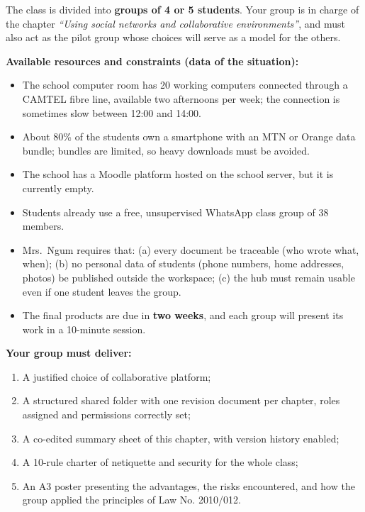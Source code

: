 \documentclass[11pt]{article}
\newcounter{popsec}
\newcounter{popsub}
\newcommand{\courssub}[1]{%
  \stepcounter{popsub}%
  \par\vspace{9pt}\noindent{\popxbold\fontsize{11.5}{13}\selectfont\color{popink}{\color{poporange}\thepopsec.\thepopsub}\hspace{6pt}#1}\par\nopagebreak\vspace{4pt}
}
\begin{document}
The class is divided into \textbf{groups of 4 or 5 students}. Your group is in charge of the chapter \emph{``Using social networks and collaborative environments''}, and must also act as the pilot group whose choices will serve as a model for the others.

\textbf{Available resources and constraints (data of the situation):}
\begin{itemize}
\item The school computer room has 20 working computers connected through a CAMTEL fibre line, available two afternoons per week; the connection is sometimes slow between 12:00 and 14:00.
\item About 80\% of the students own a smartphone with an MTN or Orange data bundle; bundles are limited, so heavy downloads must be avoided.
\item The school has a Moodle platform hosted on the school server, but it is currently empty.
\item Students already use a free, unsupervised WhatsApp class group of 38 members.
\item Mrs.\ Ngum requires that: (a) every document be traceable (who wrote what, when); (b) no personal data of students (phone numbers, home addresses, photos) be published outside the workspace; (c) the hub must remain usable even if one student leaves the group.
\item The final products are due in \textbf{two weeks}, and each group will present its work in a 10-minute session.
\end{itemize}

\textbf{Your group must deliver:}
\begin{enumerate}
\item A justified choice of collaborative platform;
\item A structured shared folder with one revision document per chapter, roles assigned and permissions correctly set;
\item A co-edited summary sheet of this chapter, with version history enabled;
\item A 10-rule charter of netiquette and security for the whole class;
\item An A3 poster presenting the advantages, the risks encountered, and how the group applied the principles of Law No. 2010/012.
\end{enumerate}

\courssub{Tasks}
\end{document}
